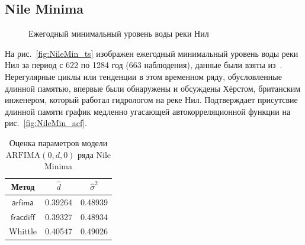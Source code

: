 \documentclass[specialist,
substylefile = spbu_report.rtx,
subf,href,colorlinks=true, 12pt]{disser}
\theoremstyle{definition}
\begin{document}
\subsection{Nile Minima}
\begin{figure}[h!]
	\centering
	\caption{Ежегодный минимальный уровень воды реки Нил}
\end{figure}

На рис.~\ref{fig:NileMin_ts} изображен ежегодный минимальный уровень воды реки Нил за период с 622 по 1284 год (663 наблюдения), данные были взяты из~\cite{Beran1994}. Нерегулярные циклы или тенденции в этом временном ряду, обусловленные длинной памятью, впервые были обнаружены и обсуждены Хёрстом, британским инженером, который работал гидрологом на реке Нил. Подтверждает присутсвие длинной памяти график медленно угасающей автокорреляционной функции на рис.~\ref{fig:NileMin_acf}.

\begin{table}[t]
	\centering
	\caption{Оценка параметров модели $\mathrm{ARFIMA}(0, d, 0)$ ряда Nile Minima}
	\label{tab:NileMin_est}
	\begin{tabular}{|c|c|c|}
		\hline
		Метод & $\hat{d}$ & $\hat{\sigma}^2$ \\
		\hline
		$\mathsf{arfima}$ & 0.39264 & 0.48939 \\
		$\mathsf{fracdiff}$ & 0.39327 & 0.48934 \\
		Whittle & 0.40547 & 0.49026 \\
		\hline
	\end{tabular}
\end{table}
\end{document}
